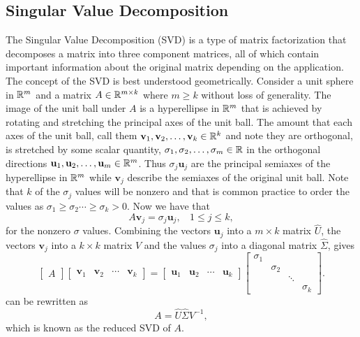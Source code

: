 \documentclass[12pt]{article}%
\begin{document}
\subsection{Singular Value Decomposition}

The Singular Value Decomposition (SVD) is a type of matrix factorization that decomposes a matrix into three component matrices, all of which contain important information about the original matrix depending on the application. The concept of the SVD is best understood geometrically. Consider a unit sphere in ${\mathbb R}^m$ and a matrix $A \in {\mathbb R}^{m \times k}$ where $m \geq k$ without loss of generality. The image of the unit ball under $A$ is a hyperellipse in ${\mathbb R}^m$ that is achieved by rotating and stretching the principal axes of the unit ball. The amount that each axes of the unit ball, call them $\mathbf{v}_1,\mathbf{v}_2,\dots,\mathbf{v}_k \in {\mathbb R}^k$ and note they are orthogonal, is stretched by some scalar quantity, $\sigma_1, \sigma_2, \dots, \sigma_m \in {\mathbb R}$ in the orthogonal directions $\mathbf{u}_1, \mathbf{u}_2, \dots, \mathbf{u}_m \in {\mathbb R}^m$. Thus $\sigma_j \mathbf{u}_j$ are the principal semiaxes of the hyperellipse in ${\mathbb R}^m$ while $\mathbf{v}_j$ describe the semiaxes of the original unit ball. Note that $k$ of the $\sigma_j$ values will be nonzero and that is common practice to order the values as $\sigma_1 \geq \sigma_2 \cdots \geq \sigma_k > 0$. Now we have that
\begin{equation}
    A \mathbf{v}_j = \sigma_j \mathbf{u}_j, ~~~~ 1 \leq j \leq k,
\end{equation}
for the nonzero $\sigma$ values. Combining the vectors $\mathbf{u}_j$ into a $m \times k$ matrix $\hat{U}$, the vectors $\mathbf{v}_j$ into a $k \times k$ matrix $V$ and the values $\sigma_j$ into a diagonal matrix $\hat{\Sigma}$, gives 
\begin{equation} 
    \begin{bmatrix}\label{lol}
        A
    \end{bmatrix} \begin{bmatrix}
        \mathbf{v}_1 & \mathbf{v}_2 & \cdots & \mathbf{v}_k
    \end{bmatrix} = \begin{bmatrix}
        \mathbf{u}_1 & \mathbf{u}_2 & \cdots & \mathbf{u}_k
    \end{bmatrix}  \begin{bmatrix}
        \sigma_{1} &  &  & \\ 
        & \sigma_{2} &  & \\ 
        &  &  \ddots & \\ 
        &  &   & \sigma_{k} 
      \end{bmatrix}.
\end{equation}
 can be rewritten as
\begin{equation} \label{reduced SVD}
    A = \hat{U}\hat{\Sigma} V^{-1},
\end{equation}
which is known as the reduced SVD of $A$.
\end{document}
